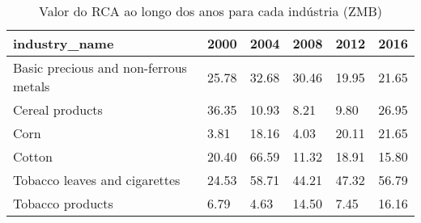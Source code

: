 \begin{table}
\centering
\caption{Valor do RCA ao longo dos anos para cada indústria (ZMB)}
\begin{tabular}{p{6cm}p{1.5cm}p{1.5cm}p{1.5cm}p{1.5cm}p{1.5cm}}
\toprule
                        industry\_name &  2000 &  2004 &  2008 &  2012 &  2016 \\
\midrule
Basic precious and non-ferrous metals & 25.78 & 32.68 & 30.46 & 19.95 & 21.65 \\
                      Cereal products & 36.35 & 10.93 &  8.21 &  9.80 & 26.95 \\
                                 Corn &  3.81 & 18.16 &  4.03 & 20.11 & 21.65 \\
                               Cotton & 20.40 & 66.59 & 11.32 & 18.91 & 15.80 \\
        Tobacco leaves and cigarettes & 24.53 & 58.71 & 44.21 & 47.32 & 56.79 \\
                     Tobacco products &  6.79 &  4.63 & 14.50 &  7.45 & 16.16 \\
\bottomrule
\end{tabular}
\end{table}
